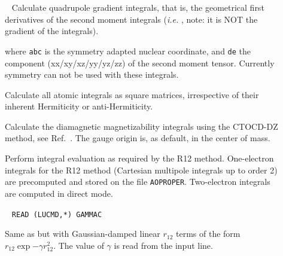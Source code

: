 \begin{description}
\item[]\verb| |\newline
Calculate quadrupole gradient integrals, that is, the geometrical first
derivatives of the second moment integrals
({\it i.e.\/} , note: it is NOT the gradient of the  integrals).

where \verb|abc| is the symmetry adapted nuclear coordinate, and \verb|de| the
component (xx/xy/xz/yy/yz/zz) of the second moment tensor. Currently
symmetry can not be used with these integrals.

\item[] Calculate all atomic integrals as square
matrices, irrespective of their inherent Hermiticity or
anti-Hermiticity.

\item[] Calculate the diamagnetic magnetizability integrals using the CTOCD-DZ method,
 see Ref.~\cite{paololazz1,paololazz2}.
The gauge origin is, as default, in the center of mass. 


\item[] Perform integral evaluation as required by the R12 method.
One-electron integrals for the R12 method (Cartesian multipole integrals up to order 2)
are precomputed and stored on the file \texttt{AOPROPER}. Two-electron integrals are
computed in direct mode.

\item[]\verb| |\newline
\verb|READ (LUCMD,*) GAMMAC|

Same as  but with Gaussian-damped linear $r_{12}$ terms of
the form $r_{12}\exp{-\gamma r_{12}^2}$. The value of $\gamma$ is read from the input line.


\end{description}
